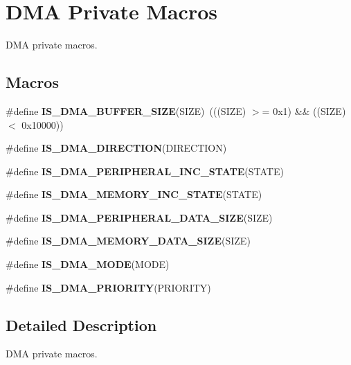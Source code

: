 \hypertarget{group___d_m_a___private___macros}{\section{D\-M\-A Private Macros}
\label{group___d_m_a___private___macros}
}


D\-M\-A private macros.  


\subsection*{Macros}
\begin{DoxyCompactItemize}
\item 
\hypertarget{group___d_m_a___private___macros_ga72ef4033bb3bc2cdfdbe579083b05e32}{\#define {\bfseries I\-S\-\_\-\-D\-M\-A\-\_\-\-B\-U\-F\-F\-E\-R\-\_\-\-S\-I\-Z\-E}(S\-I\-Z\-E)~(((S\-I\-Z\-E) $>$= 0x1) \&\& ((\-S\-I\-Z\-E) $<$ 0x10000))}\label{group___d_m_a___private___macros_ga72ef4033bb3bc2cdfdbe579083b05e32}

\item 
\#define {\bfseries I\-S\-\_\-\-D\-M\-A\-\_\-\-D\-I\-R\-E\-C\-T\-I\-O\-N}(D\-I\-R\-E\-C\-T\-I\-O\-N)
\item 
\#define {\bfseries I\-S\-\_\-\-D\-M\-A\-\_\-\-P\-E\-R\-I\-P\-H\-E\-R\-A\-L\-\_\-\-I\-N\-C\-\_\-\-S\-T\-A\-T\-E}(S\-T\-A\-T\-E)
\item 
\#define {\bfseries I\-S\-\_\-\-D\-M\-A\-\_\-\-M\-E\-M\-O\-R\-Y\-\_\-\-I\-N\-C\-\_\-\-S\-T\-A\-T\-E}(S\-T\-A\-T\-E)
\item 
\#define {\bfseries I\-S\-\_\-\-D\-M\-A\-\_\-\-P\-E\-R\-I\-P\-H\-E\-R\-A\-L\-\_\-\-D\-A\-T\-A\-\_\-\-S\-I\-Z\-E}(S\-I\-Z\-E)
\item 
\#define {\bfseries I\-S\-\_\-\-D\-M\-A\-\_\-\-M\-E\-M\-O\-R\-Y\-\_\-\-D\-A\-T\-A\-\_\-\-S\-I\-Z\-E}(S\-I\-Z\-E)
\item 
\#define {\bfseries I\-S\-\_\-\-D\-M\-A\-\_\-\-M\-O\-D\-E}(M\-O\-D\-E)
\item 
\#define {\bfseries I\-S\-\_\-\-D\-M\-A\-\_\-\-P\-R\-I\-O\-R\-I\-T\-Y}(P\-R\-I\-O\-R\-I\-T\-Y)
\end{DoxyCompactItemize}


\subsection{Detailed Description}
D\-M\-A private macros. 

